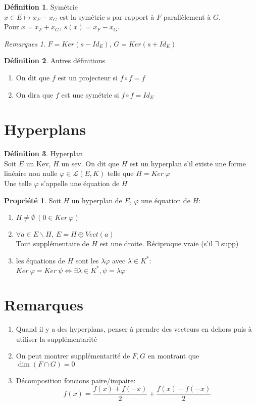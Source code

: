 \documentclass[fleqn]{article}
\theoremstyle{definition} \newtheorem*{defi}{D\'efinition}
\theoremstyle{definition} \newtheorem*{theo}{Th\'eor\`eme}
\theoremstyle{definition} \newtheorem*{coro}{Corollaire}
\theoremstyle{definition} \newtheorem*{nota}{Notation}
\theoremstyle{remark} \newtheorem*{rqs}{Remarques}
\theoremstyle{definition} \newtheorem*{prop}{Propri\'et\'e}
\begin{document}
\begin{defi} Sym\'etrie \\
	$x \in E \mapsto x_F - x_G$ est la sym\'etrie s par rapport \`a $F$ parall\`element \`a $G$. \\Pour $x = x_F + x_G,\ s(x) = x_F  - x_G$.

	\begin{rqs}
			$F = Ker (s - Id_E)$, $G = Ker (s + Id_E)$
	\end{rqs}
\end{defi}

\begin{defi} Autres d\'efinitions
	\begin{enumerate}
		\item On dit que $f$ est un projecteur si $f \circ f = f$
		\item On dira que $f$ est une sym\'etrie si $f \circ f = Id_E$
	\end{enumerate}
\end{defi}

\section{Hyperplans}
\begin{defi} Hyperplan \\
	Soit $E$ un Kev, $H$ un sev. On dit que $H$ est un hyperplan s'il existe une forme lin\'eaire non nulle $\varphi \in \mathscr{L}(E,K)$ telle
	que $H = Ker\ \varphi$ \\
	Une telle $\varphi$ s'appelle une \'equation de $H$
\end{defi}

\begin{prop} Soit $H$ un hyperplan de $E$, $\varphi$ une \'equation de $H$:
	\begin{enumerate}
		\item $H \neq \emptyset\ (0 \in Ker\ \varphi)$
		\item $\forall a \in E \backslash H,\ E = H \oplus Vect(a)$ \\
			Tout suppl\'ementaire de $H$ est une droite. R\'eciproque vraie (s'il $\exists$ supp)
		\item les \'equations de $H$ sont les $\lambda \varphi$ avec $\lambda \in K^*$: \\
			$Ker\ \varphi = Ker\ \psi \Leftrightarrow \exists \lambda \in K^*, \psi = \lambda \varphi$
	\end{enumerate}
\end{prop}

\section{Remarques}
\begin{enumerate}
	\item Quand il y a des hyperplans, penser \`a prendre des vecteurs en dehors puis \`a utiliser la suppl\'ementarit\'e
	\item On peut montrer suppl\'ementarit\'e de $F,G$ en montrant que $\dim (F\cap G) = 0$
	\item D\'ecomposition foncions paire/impaire: \[f(x) = \frac{f(x) + f(-x)}{2} + \frac{f(x) - f(-x)}{2}\]
\end{enumerate}
\end{document}
